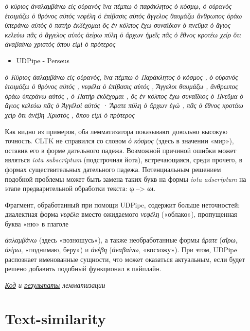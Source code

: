 \documentclass[
  letterpaper,
]{book}
\providecommand{\tightlist}{%
  \setlength{\itemsep}{0pt}\setlength{\parskip}{0pt}}\usepackage{longtable,booktabs,array}
\begin{document}
\emph{ὁ κύριος ἀναλαμβάνω εἰς οὐρανός ἵνα πέμπω ὁ παράκλητος ὁ κόσμῳ, ὁ
οὐρανός ἑτοιμάζω ὁ θρόνος αὐτός νεφέλη ὁ ἐπίβασις αὐτός ἄγγελος θαυμάζω
ἄνθρωπος ὁράω ὑπεράνω αὐτός ὁ πατήρ ἐκδέχομαι ὅς ἐν κόλπος ἔχω συναΐδιον
ὁ πνεῦμα ὁ ἅγιος κελεύω πᾶς ὁ ἄγγελος αὐτός ἀείρω πύλη ὁ ἄρχων ἡμεῖς πᾶς
ὁ ἔθνος κροτέω χείρ ὅτι ἀναβαίνω χριστός ὅπου εἰμί ὁ πρότερος}

\begin{itemize}
\tightlist
\item
  UDPipe - Perseus
\end{itemize}

\emph{ὁ Κύριος ἀαλαμβάνω εἰς οὐρανός, ἵνα πέμπω ὁ Παράκλητος ὁ κόσμος ,
ὁ οὐρανός ἑτοιμάζω ὁ θρόνος αὐτός , νεφέλα ὁ ἐπίβασις αὐτός , Ἄγγελοι
θαυμάζω , ἄνθρωπος ὁράω ὑπεράνω αὐτός , ὁ Πατὴρ ἐκδέχομαι , ὅς ἐν κόλπος
ἔχω συναΐδιος ὁ Πνεῦμα ὁ ἅγιος κελεύω πᾶς ὁ Ἀγγέλοί αὐτός · Ἄρατε πύλη ὁ
ἄρχων ἐγώ , πᾶς ὁ ἔθνος κροτάω χείρ ὅτι ἀνέβη Χριστός , ὅπου εἰμί ὁ
πρότερος}

Как видно из примеров, оба лемматизатора показывают довольно высокую
точность. CLTK не справился со словом \emph{ὁ κόσμος} (здесь в значении
«мир»), оставив его в форме дательного падежа. Возможной причиной ошибки
может являться \emph{iota subscriptum} (подстрочная йота),
встречающаяся, среди прочего, в формах существительных дательного
падежа. Потенциальным решением подобной проблемы может быть замена таких
букв на формы \emph{iota adscriptum} на этапе предварительной обработки
текста: ῳ --\textgreater{} ωι.

Фрагмент, обработанный при помощи UDPipe, содержит больше неточностей:
диалектная форма \emph{νεφέλα} вместо ожидаемого \emph{νεφέλη}
(«облако»), пропущенная буква «ню» в глаголе

\emph{ἀαλαμβάνω} (здесь «возношусь»), а также необработанные формы
\emph{ἄρατε} (\emph{αἴρω}, \emph{ἀείρω}, «поднимаю, беру») и
\emph{ἀνέβη} (\emph{ἀναβαίνω}, «восхожу»). При этом, UDPipe распознает
именованные сущности, что может оказаться актуальным, если будет решено
добавить подобный функционал в пайплайн.

\emph{\href{https://github.com/Drozhzhinastya/GSPC/tree/main/scripts/lemmatization}{Код}
и
\href{https://github.com/Drozhzhinastya/GSPC/tree/main/lemmatization/greek}{результаты}
лемматизации}


\hypertarget{text-similarity}{%
\chapter{\texorpdfstring{\textbf{Text-similarity}}{Text-similarity}}\label{text-similarity}}
\end{document}
